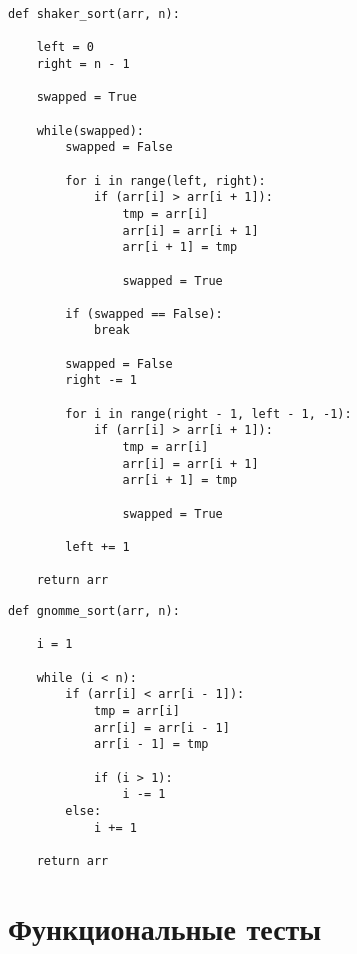 \begin{center}
\captionsetup{justification=raggedright,singlelinecheck=off}
\begin{lstlisting}[label=lst:shaker_sort,caption=Алгоритм сортировки перемешиванием]
    def shaker_sort(arr, n):

    left = 0
    right = n - 1

    swapped = True

    while(swapped):
        swapped = False

        for i in range(left, right):
            if (arr[i] > arr[i + 1]):
                tmp = arr[i]
                arr[i] = arr[i + 1]
                arr[i + 1] = tmp

                swapped = True

        if (swapped == False):
            break

        swapped = False
        right -= 1

        for i in range(right - 1, left - 1, -1):
            if (arr[i] > arr[i + 1]):
                tmp = arr[i]
                arr[i] = arr[i + 1]
                arr[i + 1] = tmp

                swapped = True

        left += 1

    return arr
\end{lstlisting}
\end{center}



\begin{center}
\captionsetup{justification=raggedright,singlelinecheck=off}
\begin{lstlisting}[label=lst:gnomme_sort,caption=Алгоритм гномьей сортировки]
    def gnomme_sort(arr, n):
    
    i = 1

    while (i < n):
        if (arr[i] < arr[i - 1]):
            tmp = arr[i]
            arr[i] = arr[i - 1]
            arr[i - 1] = tmp

            if (i > 1):
                i -= 1
        else:
            i += 1

    return arr
\end{lstlisting}
\end{center}

\section{Функциональные тесты}

